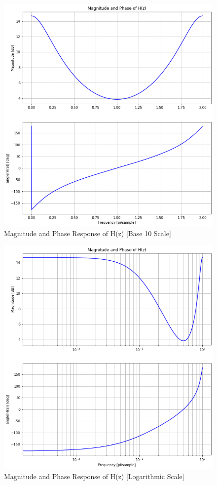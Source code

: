\documentclass[12pt]{report}
\begin{document}
\begin{figure}[h!]
  \centering
  \includegraphics[width=\linewidth]{t5ns.png}
  \caption{Magnitude and Phase Response of H(z) [Base 10 Scale]}
  \label{fig: t5ns}
\end{figure}
\begin{figure}[h!]
  \centering
  \includegraphics[width=\linewidth]{t5ls.png}
  \caption{Magnitude and Phase Response of H(z) [Logarithmic Scale]}
  \label{fig: t5ls}
\end{figure}
\end{document}
